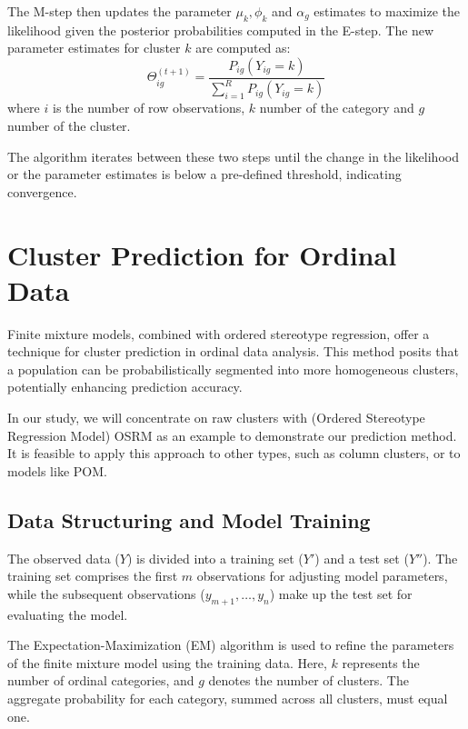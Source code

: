 \documentclass{article}
\begin{document}
The M-step then updates the parameter $\mu_k, \phi_k$ and $\alpha_g$ estimates to maximize the likelihood given the posterior probabilities computed in the E-step. 
The new parameter estimates for cluster \( k \) are computed as:
\begin{equation}
\Theta_{ig}^{(t+1)} = \frac{P_{ig}(Y_{ig} = k)}{\sum_{i=1}^{R} P_{ig}(Y_{ig} = k)}
\end{equation}
where \( i \) is the number of row observations, \( k \) number of the category and \( g \) number of the cluster.

The algorithm iterates between these two steps until the change in the likelihood or the parameter estimates is below a pre-defined threshold, indicating convergence.




\section{Cluster Prediction for Ordinal Data}

Finite mixture models, combined with ordered stereotype regression, offer a technique for cluster prediction in ordinal data analysis. This method posits that a population can be probabilistically segmented into more homogeneous clusters, potentially enhancing prediction accuracy.

In our study, we will concentrate on raw clusters with (Ordered Stereotype Regression Model) OSRM as an example to demonstrate our prediction method. It is feasible to apply this approach to other types, such as column clusters, or to models like POM.

\subsection{Data Structuring and Model Training}

The observed data ($Y$) is divided into a training set ($Y'$) and a test set ($Y''$). The training set comprises the first $m$ observations for adjusting model parameters, while the subsequent observations ($y_{m+1}, \dots, y_n$) make up the test set for evaluating the model.

The Expectation-Maximization (EM) algorithm is used to refine the parameters of the finite mixture model using the training data. Here, $k$ represents the number of ordinal categories, and $g$ denotes the number of clusters. The aggregate probability for each category, summed across all clusters, must equal one.
\end{document}

